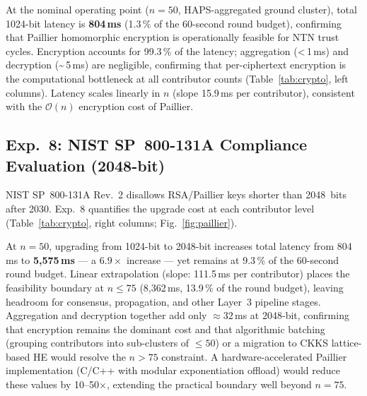 \documentclass[journal,twoside,10pt]{IEEEtran}
\begin{document}
At the nominal operating point ($n\!=\!50$, HAPS-aggregated ground
cluster), total 1024-bit latency is \textbf{804\,ms}
(1.3\,\% of the 60-second round budget), confirming that Paillier
homomorphic encryption is operationally feasible for NTN trust cycles.
Encryption accounts for 99.3\,\% of the latency; aggregation
(\textless\,1\,ms) and decryption (\textasciitilde\,5\,ms) are
negligible, confirming that per-ciphertext encryption is the
computational bottleneck at all contributor counts
(Table~\ref{tab:crypto}, left columns).
Latency scales linearly in $n$ (slope 15.9\,ms per contributor),
consistent with the $\mathcal{O}(n)$ encryption cost of Paillier.

\subsection{Exp.~8: NIST SP~800-131A Compliance Evaluation (2048-bit)}

NIST SP~800-131A Rev.~2 disallows RSA/Paillier keys shorter than
2048~bits after 2030.
Exp.~8 quantifies the upgrade cost at each contributor level
(Table~\ref{tab:crypto}, right columns; Fig.~\ref{fig:paillier}).

At $n\!=\!50$, upgrading from 1024-bit to 2048-bit increases total
latency from 804\,ms to \textbf{5{,}575\,ms} --- a $6.9\times$
increase --- yet remains at 9.3\,\% of the 60-second round budget.
Linear extrapolation (slope: 111.5\,ms per contributor) places the
feasibility boundary at $n\!\leq\!75$ (8{,}362\,ms, 13.9\,\% of the
round budget), leaving headroom for consensus, propagation, and
other Layer~3 pipeline stages.
Aggregation and decryption together add only $\approx\!32$\,ms at
2048-bit, confirming that encryption remains the dominant cost and
that algorithmic batching (grouping contributors into sub-clusters of
$\leq\!50$) or a migration to CKKS lattice-based HE would
resolve the $n\!>\!75$ constraint.
A hardware-accelerated Paillier implementation (C/C++ with modular
exponentiation offload) would reduce these values by 10--50$\times$,
extending the practical boundary well beyond $n\!=\!75$.
\end{document}
